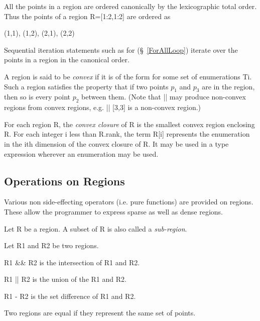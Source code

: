 All the points in a region are ordered canonically by the lexicographic total order. Thus the points of a region {\cf R=[1:2,1:2]} are ordered as 
\begin{x10}
  (1,1), (1,2), (2,1), (2,2)
\end{x10}
Sequential iteration statements such as {\cf for} (\S~\ref{ForAllLoop})
iterate over the points in a region in the canonical order.

A region is said to be {\em convex} if it is of
the form {\cf [T1,..., Tk]} for some set of enumerations {\cf Ti}. Such a
region satisfies the property that if two points $p_1$ and $p_3$ are
in the region, then so is every point $p_2$ between them. (Note that
{\cf ||} may produce non-convex regions from convex regions, e.g.{}
{\cf [1,1] || [3,3]} is a non-convex region.)

For each region {\cf R}, the {\em convex closure} of {\cf R} is the
smallest convex region enclosing {\cf R}.  For each integer {\cf i}
less than {\cf R.rank}, the term {\cf R[i]} represents the enumeration
in the {\cf i}th dimension of the convex closure of {\cf R}. It may be
used in a type expression wherever an enumeration may be used.

\subsection{Operations on Regions}
Various non side-effecting operators (i.e.{} pure functions) are
provided on regions. These allow the programmer to express sparse as
well as dense regions.

Let {\cf R} be a region. A subset of {\cf R} is also called a {\em
sub-region}.

Let {\cf R1} and {\cf R2} be two regions.

{\cf R1 \&\& R2} is the intersection of {\cf R1} and {\cf R2}.

{\cf R1 || R2} is the union of the {\cf R1} and {\cf R2}.

{\cf R1 - R2} is the set difference of {\cf R1} and {\cf R2}.

Two regions are equal if they represent the same set of
points.











